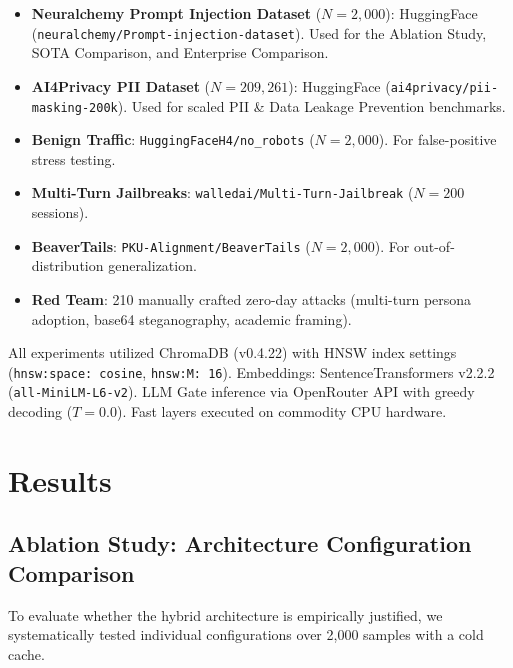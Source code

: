 \documentclass[conference]{IEEEtran}
\begin{document}
\begin{itemize}
    \item \textbf{Neuralchemy Prompt Injection Dataset} ($N{=}2{,}000$): HuggingFace (\texttt{neuralchemy/Prompt-injection-dataset}). Used for the Ablation Study, SOTA Comparison, and Enterprise Comparison.
    \item \textbf{AI4Privacy PII Dataset} ($N{=}209{,}261$): HuggingFace (\texttt{ai4privacy/pii-masking-200k}). Used for scaled PII \& Data Leakage Prevention benchmarks.
    \item \textbf{Benign Traffic}: \texttt{HuggingFaceH4/no\_robots} ($N{=}2{,}000$). For false-positive stress testing.
    \item \textbf{Multi-Turn Jailbreaks}: \texttt{walledai/Multi-Turn-Jailbreak} ($N{=}200$ sessions).
    \item \textbf{BeaverTails}: \texttt{PKU-Alignment/BeaverTails} ($N{=}2{,}000$). For out-of-distribution generalization.
    \item \textbf{Red Team}: 210 manually crafted zero-day attacks (multi-turn persona adoption, base64 steganography, academic framing).
\end{itemize}

All experiments utilized ChromaDB (v0.4.22) with HNSW index settings (\texttt{hnsw:space: cosine}, \texttt{hnsw:M: 16}). Embeddings: SentenceTransformers v2.2.2 (\texttt{all-MiniLM-L6-v2}). LLM Gate inference via OpenRouter API with greedy decoding ($T{=}0.0$). Fast layers executed on commodity CPU hardware.

\section{Results}

\subsection{Ablation Study: Architecture Configuration Comparison}

To evaluate whether the hybrid architecture is empirically justified, we systematically tested individual configurations over 2,000 samples with a cold cache.
\end{document}
